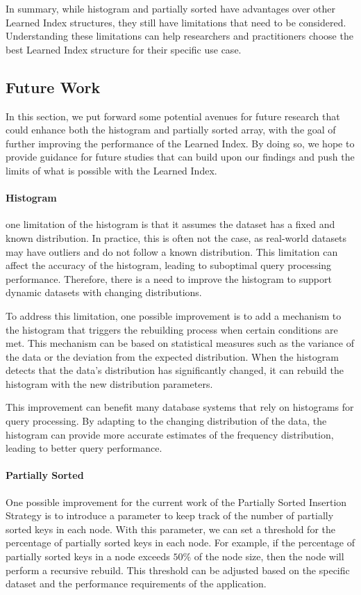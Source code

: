\documentclass[11pt,a4paper]{article}
\newcommand{\learnindex}{\textsf{Learned Index}\xspace}
\begin{document}
In summary, while histogram and partially sorted have advantages over other \learnindex structures, they still have limitations that need to be considered. Understanding these limitations can help researchers and practitioners choose the best \learnindex structure for their specific use case.

\subsection{Future Work}
In this section, we put forward some potential avenues for future research that could enhance both the histogram and partially sorted array, with the goal of further improving the performance of the \learnindex. By doing so, we hope to provide guidance for future studies that can build upon our findings and push the limits of what is possible with the \learnindex.
\paragraph{Histogram}
 one limitation of the histogram is that it assumes the dataset has a fixed and known distribution. In practice, this is often not the case, as real-world datasets may have outliers and do not follow a known distribution. This limitation can affect the accuracy of the histogram, leading to suboptimal query processing performance. Therefore, there is a need to improve the histogram to support dynamic datasets with changing distributions.

To address this limitation, one possible improvement is to add a mechanism to the histogram that triggers the rebuilding process when certain conditions are met. This mechanism can be based on statistical measures such as the variance of the data or the deviation from the expected distribution. When the histogram detects that the data's distribution has significantly changed, it can rebuild the histogram with the new distribution parameters.

This improvement can benefit many database systems that rely on histograms for query processing. By adapting to the changing distribution of the data, the histogram can provide more accurate estimates of the frequency distribution, leading to better query performance.


\paragraph{Partially Sorted}
One possible improvement for the current work of the Partially Sorted Insertion Strategy is to introduce a parameter to keep track of the number of partially sorted keys in each node. With this parameter, we can set a threshold for the percentage of partially sorted keys in each node. For example, if the percentage of partially sorted keys in a node exceeds $50\%$ of the node size, then the node will perform a recursive rebuild. This threshold can be adjusted based on the specific dataset and the performance requirements of the application.
\end{document}
